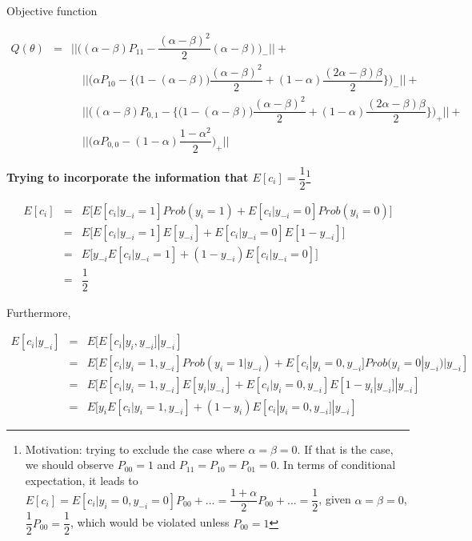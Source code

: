 \documentclass[a4paper]{article}
\begin{document}
Objective function

$$
\begin{array}{rcl}
Q(\theta) & = & ||\big((\alpha - \beta)P_{11} - \dfrac{(\alpha - \beta)^2}{2}(\alpha - \beta))_-|| + \\
&& \quad ||\big(\alpha P_{10} - \{\big(1 - (\alpha - \beta)\big)\dfrac{(\alpha - \beta)^2}{2} + (1 - \alpha)\dfrac{(2\alpha - \beta)\beta}{2}\})_-|| + \\
&& \quad ||\big((\alpha - \beta)P_{0,1} - \{\big(1 - (\alpha - \beta)\big)\dfrac{(\alpha - \beta)^2}{2} + (1 - \alpha)\dfrac{(2\alpha - \beta)\beta}{2}\})_+|| + \\
&& \quad ||\big(\alpha P_{0,0} - (1 - \alpha)\dfrac{1 - \alpha^2}{2})_+||
\end{array}
$$

\textbf{Trying to incorporate the information that $E[c_i] = \dfrac{1}{2}$}\footnote{Motivation: trying to exclude the case where $\alpha = \beta = 0$. If that is the case, we should observe $P_{00} = 1$ and $P_{11} = P_{10} = P_{01} = 0$. In terms of conditional expectation, it leads to $E[c_i] = E[c_i|y_{i} = 0, y_{-i} = 0]P_{00} + ...= \dfrac{1 + \alpha}{2}P_{00} + ...= \dfrac{1}{2}$, given $\alpha = \beta = 0$, $\dfrac{1}{2}P_{00} = \dfrac{1}{2}$, which would be violated unless $P_{00} = 1$}

\begin{equation}
\begin{array}{rcl}
    E[c_i] 
    &=& E\Big[E[c_i|y_{-i} = 1]Prob(y_i = 1) + E[c_i|y_{-i} = 0]Prob(y_i = 0)\Big]\\
    &=& E\Big[E[c_i|y_{-i} = 1]E[y_{-i}] + E[c_i|y_{-i} = 0]E[1 - y_{-i}]\Big]\\
    &=& E\Big[y_{-i}E[c_i|y_{-i} = 1] + (1 - y_{-i})E[c_i|y_{-i} = 0]\Big]\\
    &=& \dfrac{1}{2}
\end{array}
\label{Ec_i}
\end{equation}

Furthermore,

\begin{equation}
\begin{array}{rcl}
    E[c_i|y_{-i}] 
&=& E[E[c_i|y_i, y_{-i}]|y_{-i}]\\
&=& E[E[c_i|y_i = 1, y_{-i}]Prob(y_i = 1 | y_{-i}) + E[c_i|y_i = 0, y_{-i}]Prob(y_i = 0 | y_{-i})|y_{-i}]\\
&=& E[E[c_i|y_i = 1, y_{-i}]E[y_i | y_{-i}] + E[c_i|y_i = 0, y_{-i}]E[1 - y_i | y_{-i}]|y_{-i}] \\
&=& E[y_iE[c_i|y_i = 1, y_{-i}] + (1 - y_i)E[c_i|y_i = 0, y_{-i}]|y_{-i}]
\end{array}
\label{Ec_i|y_j}
\end{equation}
\end{document}

